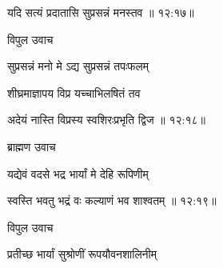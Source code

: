 
{\devanagarifont यदि सत्यं प्रदातासि सुप्रसन्नं मनस्तव {॥ १२:१७॥} \veg\dontdisplaylinenum }%

{\devanagarifont विपुल उवाच {\dandab}\dontdisplaylinenum  }%
 
{\devanagarifont सुप्रसन्नं मनो मे ऽद्य सुप्रसन्नं तपःफलम् \thinspace{\danda} \dontdisplaylinenum }%

{\devanagarifont शीघ्रमाज्ञापय विप्र यच्चाभिलषितं तव  \danda\dontdisplaylinenum }%


{\devanagarifont अदेयं नास्ति विप्रस्य स्वशिरःप्रभृति द्विज {॥ १२:१८॥} \veg\dontdisplaylinenum }%

{\devanagarifont ब्राह्मण उवाच {\dandab}\dontdisplaylinenum  }%

{\devanagarifont यद्येवं वदसे भद्र भार्यां मे देहि रूपिणीम् \thinspace{\danda} \dontdisplaylinenum }%


{\devanagarifont स्वस्ति भवतु भद्रं वः कल्याणं भव शाश्वतम् {॥ १२:१९॥} \veg\dontdisplaylinenum }%

{\devanagarifont विपुल उवाच {\dandab}\dontdisplaylinenum  }%

{\devanagarifont प्रतीच्छ भार्यां सुश्रोणीं रूपयौवनशालिनीम् \thinspace{\danda} \dontdisplaylinenum }%


